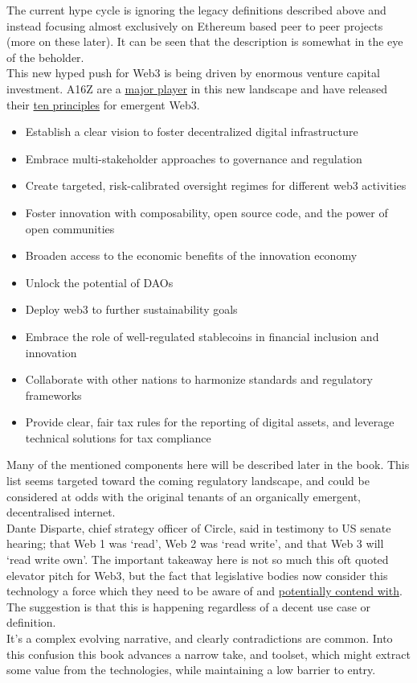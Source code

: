 The current hype cycle is ignoring the legacy definitions described above and instead focusing almost exclusively on Ethereum based peer to peer projects (more on these later). It can be seen that the description is somewhat in the eye of the beholder.\\
This new hyped push for Web3 is being driven by enormous venture capital investment. A16Z are a \href{https://a16z.com/2022/01/07/9b-to-build-the-future/}{major player} in this new landscape and have released their \href{https://a16z.com/2022/01/07/how-to-build-a-better-internet-10-principles-for-world-leaders-shaping-the-future-of-web3/}{ten principles} for emergent Web3. 
\begin{itemize}
\item Establish a clear vision to foster decentralized digital infrastructure
\item Embrace multi-stakeholder approaches to governance and regulation
\item Create targeted, risk-calibrated oversight regimes for different web3 activities
\item Foster innovation with composability, open source code, and the power of open communities
\item Broaden access to the economic benefits of the innovation economy
\item Unlock the potential of DAOs
\item Deploy web3 to further sustainability goals
\item Embrace the role of well-regulated stablecoins in financial inclusion and innovation
\item Collaborate with other nations to harmonize standards and regulatory frameworks
\item Provide clear, fair tax rules for the reporting of digital assets, and leverage technical solutions for tax compliance
\end{itemize}
Many of the mentioned components here will be described later in the book. This list seems targeted toward the coming regulatory landscape, and could be considered at odds with the original tenants of an organically emergent, decentralised internet.\\
Dante Disparte, chief strategy officer of Circle, said in testimony to US senate hearing; that Web 1 was `read', Web 2 was `read write', and that Web 3 will `read write own'. The important takeaway here is not so much this oft quoted elevator pitch for Web3, but the fact that legislative bodies now consider this technology a force which they need to be aware of and \href{https://a16z.com/2021/12/17/prediction-for-the-new-year-a-web3-midterm/}{potentially contend with}. The suggestion is that this is happening regardless of a decent use case or definition.\\
It's a complex evolving narrative, and clearly contradictions are common. Into this confusion this book advances a narrow take, and toolset, which might extract some value from the technologies, while maintaining a low barrier to entry.\\ 

